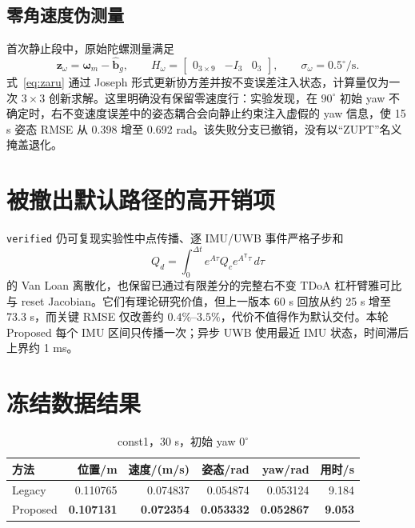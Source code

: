 \documentclass[11pt,a4paper]{ctexart}
\begin{document}
\subsection{零角速度伪测量}

首次静止段中，原始陀螺测量满足
\begin{equation}
 \bm z_\omega=\bm\omega_m-\hat{\bm b}_g,
 \qquad
 H_\omega=\begin{bmatrix}0_{3\times9}&-I_3&0_3\end{bmatrix},
 \qquad \sigma_\omega=0.5^\circ/\mathrm{s}.
 \label{eq:zaru}
\end{equation}
式~\eqref{eq:zaru} 通过 Joseph 形式更新协方差并按不变误差注入状态，计算量仅为一次
$3\times3$ 创新求解。这里明确没有保留零速度行：实验发现，在 $90^\circ$ 初始 yaw
不确定时，右不变速度误差中的姿态耦合会向静止约束注入虚假的 yaw 信息，使 15 s
姿态 RMSE 从 0.398 增至 0.692 rad。该失败分支已撤销，没有以“ZUPT”名义掩盖退化。

\section{被撤出默认路径的高开销项}

\texttt{verified} 仍可复现实验性中点传播、逐 IMU/UWB 事件严格子步和
\begin{equation}
 Q_d=\int_0^{\Delta t}e^{A\tau}Q_c e^{A^{\mathsf T}\tau}\,d\tau
\end{equation}
的 Van Loan 离散化，也保留已通过有限差分的完整右不变 TDoA 杠杆臂雅可比与 reset
Jacobian。它们有理论研究价值，但上一版本 60 s 回放从约 25 s 增至 73.3 s，而关键
RMSE 仅改善约 $0.4\%$--$3.5\%$，代价不值得作为默认交付。本轮 Proposed 每个 IMU
区间只传播一次；异步 UWB 使用最近 IMU 状态，时间滞后上界约 1 ms。

\section{冻结数据结果}

\begin{table}[htbp]
\centering
\caption{const1，30 s，初始 yaw $0^\circ$}
\begin{tabular}{lrrrrr}
\toprule
方法 & 位置/m & 速度/(m/s) & 姿态/rad & yaw/rad & 用时/s\\
\midrule
Legacy & 0.110765 & 0.074837 & 0.054874 & 0.053124 & 9.184\\
Proposed & \textbf{0.107131} & \textbf{0.072354} & \textbf{0.053332} & \textbf{0.052867} & \textbf{9.053}\\
\bottomrule
\end{tabular}
\end{table}
\end{document}
